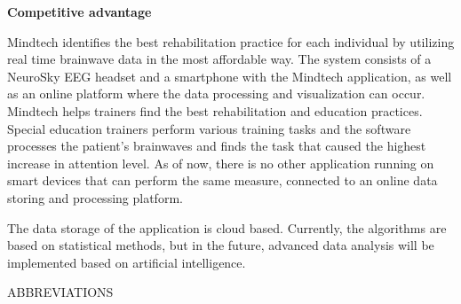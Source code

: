 \documentclass[letterpaper,10pt]{article}
\begin{document}
\begin{onehalfspace}
\large{\bf{Competitive advantage}}

Mindtech identifies the best rehabilitation practice for each individual by utilizing real time brainwave data in the most affordable way. The system consists of a NeuroSky EEG headset and a smartphone with the Mindtech application, as well as an online platform where the data processing and visualization can occur. Mindtech helps trainers find the best rehabilitation and education practices. Special education trainers perform various training tasks and the software processes the patient's brainwaves and finds the task that caused the highest increase in attention level. As of now, there is no other application running on smart devices that can perform the same measure, connected to an online data storing and processing platform. 

The data storage of the application is cloud based. Currently, the algorithms are based on statistical methods, but in the future, advanced data analysis will be implemented based on artificial intelligence.


\end{onehalfspace}


\newpage
\tableofcontents

\newpage
\listoffigures
\newpage
\listoftables

\newpage
\vspace{70mm}
\begin{center}

\uppercase{\Large{Abbreviations}}

\vspace{20mm}
\end{center}
\end{document}
